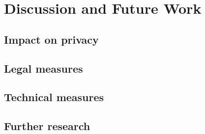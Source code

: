 \section{Discussion and Future Work}
\label{sec:discussion}

\subsection{Impact on privacy}

\subsection{Legal measures}

\subsection{Technical measures}

\subsection{Further research}